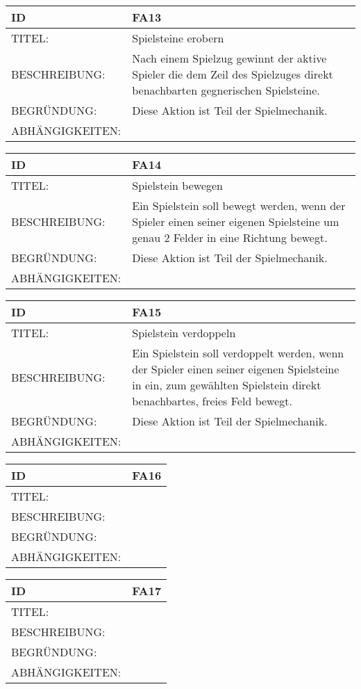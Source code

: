 \documentclass{uulm-assignment}
\begin{document}
\begin{tabularx}{16cm}{l|X}
\textbf{ID} & \textbf{FA13} \\
\hline
TITEL: & Spielsteine erobern \\
\hline
BESCHREIBUNG: & Nach einem Spielzug gewinnt der aktive Spieler die dem Zeil des Spielzuges direkt benachbarten gegnerischen Spielsteine.
\\
\hline
BEGRÜNDUNG: & Diese Aktion ist Teil der Spielmechanik. \\
\hline
ABHÄNGIGKEITEN: & \\
\end{tabularx}

\begin{tabularx}{16cm}{l|X}
\textbf{ID} & \textbf{FA14} \\
\hline
TITEL: & Spielstein bewegen \\
\hline
BESCHREIBUNG: & Ein Spielstein soll bewegt werden, wenn der Spieler einen seiner eigenen Spielsteine um genau 2 Felder in eine Richtung bewegt.
\\
\hline
BEGRÜNDUNG: & Diese Aktion ist Teil der Spielmechanik. \\
\hline
ABHÄNGIGKEITEN: & \\
\end{tabularx}

\begin{tabularx}{16cm}{l|X}
\textbf{ID} & \textbf{FA15} \\
\hline
TITEL: & Spielstein verdoppeln \\
\hline
BESCHREIBUNG: & Ein Spielstein soll verdoppelt werden, wenn der Spieler einen seiner eigenen Spielsteine in ein, zum gewählten Spielstein direkt benachbartes, freies Feld bewegt.
\\
\hline
BEGRÜNDUNG: & Diese Aktion ist Teil der Spielmechanik. \\
\hline
ABHÄNGIGKEITEN: & \\
\end{tabularx}

\begin{tabularx}{16cm}{l|X}
\textbf{ID} & \textbf{FA16} \\
\hline
TITEL: & \\
\hline
BESCHREIBUNG: & 
\\
\hline
BEGRÜNDUNG: & \\
\hline
ABHÄNGIGKEITEN: & \\
\end{tabularx}

\begin{tabularx}{16cm}{l|X}
\textbf{ID} & \textbf{FA17} \\
\hline
TITEL: & \\
\hline
BESCHREIBUNG: & 
\\
\hline
BEGRÜNDUNG: & \\
\hline
ABHÄNGIGKEITEN: & \\
\end{tabularx}
\end{document}
